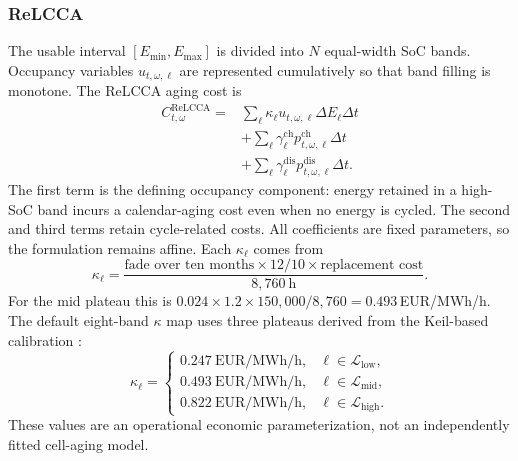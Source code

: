 \documentclass[journal,12pt,twocolumn]{IEEEtran}
\begin{document}
\subsubsection{ReLCCA}
The usable interval $[E_{\min}, E_{\max}]$ is divided into $N$ equal-width SoC bands. Occupancy variables $u_{t,\omega,\ell}$ are represented cumulatively so that band filling is monotone. The ReLCCA aging cost is
\begin{equation}
\begin{split}
C_{t,\omega}^{\text{ReLCCA}} = & \sum_{\ell} \kappa_{\ell} u_{t,\omega,\ell} \Delta E_{\ell} \Delta t \\
& + \sum_{\ell} \gamma_{\ell}^{\text{ch}} p_{t,\omega,\ell}^{\text{ch}} \Delta t \\
& + \sum_{\ell} \gamma_{\ell}^{\text{dis}} p_{t,\omega,\ell}^{\text{dis}} \Delta t.
\end{split}
\label{eq:relcca}
\end{equation}
The first term is the defining occupancy component: energy retained in a high-SoC band incurs a calendar-aging cost even when no energy is cycled. The second and third terms retain cycle-related costs. All coefficients are fixed parameters, so the formulation remains affine. Each $\kappa_{\ell}$ comes from
\begin{equation}
\kappa_{\ell} = \frac{\text{fade over ten months} \times 12/10 \times \text{replacement cost}}{8{,}760~\text{h}}.
\label{eq:kappa}
\end{equation}
For the mid plateau this is $0.024 \times 1.2 \times 150{,}000 / 8{,}760 = 0.493$\,EUR/MWh/h. The default eight-band $\kappa$ map uses three plateaus derived from the Keil-based calibration \cite{Keil2016}:
\begin{equation}
\kappa_{\ell} =
\begin{cases}
0.247~\text{EUR/MWh/h}, & \ell \in \mathcal{L}_{\text{low}},\\
0.493~\text{EUR/MWh/h}, & \ell \in \mathcal{L}_{\text{mid}},\\
0.822~\text{EUR/MWh/h}, & \ell \in \mathcal{L}_{\text{high}}.
\end{cases}
\label{eq:kappa_plateaus}
\end{equation}
These values are an operational economic parameterization, not an independently fitted cell-aging model.
\end{document}
